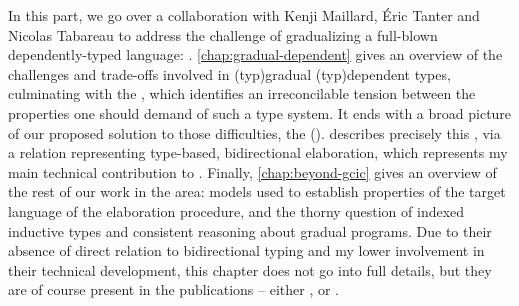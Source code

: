 In this part, we go over a collaboration with Kenji Maillard, Éric Tanter and Nicolas
Tabareau to address the challenge of gradualizing a full-blown dependently-typed language:
 .
\cref{chap:gradual-dependent} gives an overview of the challenges and trade-offs
involved in \kl(typ){gradual} \kl(typ){dependent} types, culminating with the
, which identifies an irreconcilable tension between
the properties one should demand of such a type system. It ends with a broad picture
of our proposed solution to those difficulties,
the  ().
 describes precisely this ,
via a relation representing type-based, bidirectional elaboration,
which represents my main technical contribution to \textcite{LennonBertrand2022}.
Finally, \cref{chap:beyond-gcic} gives an overview of the rest of our work in the area:
models used to establish properties of the target language of the elaboration procedure,
and the thorny question of indexed inductive types and consistent reasoning about gradual
programs.
Due to their absence of direct relation to bidirectional typing and my lower
involvement in their technical development, this chapter does not go into full details,
but they are of course present in the publications –
either , or .
